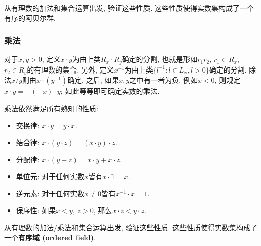 \begin{exercise}{}
从有理数的加法和集合运算出发, 验证这些性质. 这些性质使得实数集构成了一个有序的阿贝尔群.
\end{exercise}

\subsubsection{乘法}

对于$x,y>0$, 定义$x\cdot y$为由上类$R_x\cdot R_y$确定的分割, 也就是形如$r_1r_2$, $r_1\in R_x$, $r_2\in R_y$的有理数的集合. 另外, 定义$x^{-1}$为由上类$\{l^{-1}:l\in L_x,l>0\}$确定的分割. 除法$x/y$则由$x\cdot(y^{-1})$确定. 之后, 如果$x,y$之中有一者为负, 例如$x<0$, 则规定$x\cdot y=-(-x)\cdot y$; 如此等等即可确定实数的乘法. 

乘法依然满足所有熟知的性质:

\begin{itemize}
\item 交换律: $x\cdot y=y\cdot x$.
\item 结合律: $x\cdot (y\cdot z)=(x\cdot y)\cdot z$.
\item 分配律: $x\cdot (y+z)=x\cdot y+x\cdot z$.
\item 单位元: 对于任何实数$x$皆有$x\cdot 1=x$.
\item 逆元素: 对于任何实数$x\neq0$皆有$x^{-1}\cdot x=1$.
\item 保序性: 如果$x<y$, $z>0$, 那么$x\cdot z<y\cdot z$.
\end{itemize}

\begin{exercise}{}
从有理数的加法/乘法和集合运算出发, 验证这些性质. 这些性质使得实数集构成了一个\textbf{有序域 (ordered field)}.
\end{exercise}
